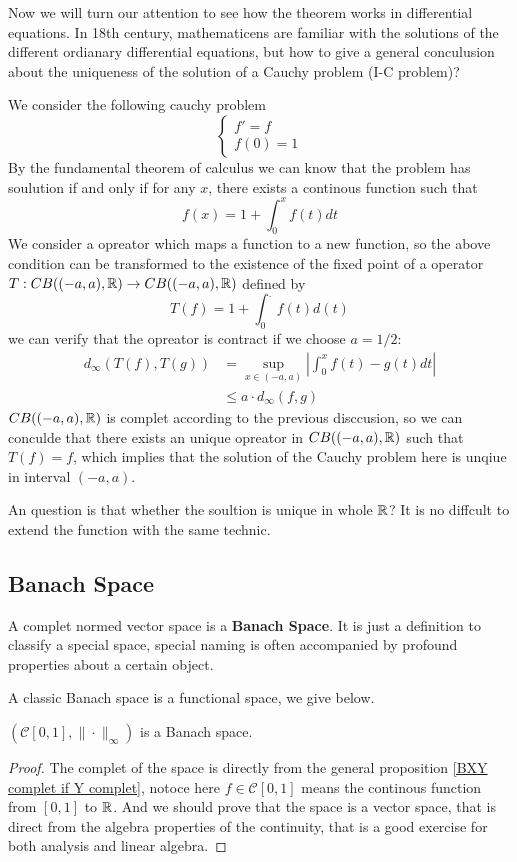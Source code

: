\documentclass[en,hazy,blue,noraml,12pt]{elegantnote}
\begin{document}
Now we will turn our attention to see how the theorem works in differential equations. In 18th century, mathematicens are familiar with the solutions of the different ordianary differential equations, but how to give a general conculusion about the uniqueness of the solution of a Cauchy problem (I-C problem)?

\begin{example}
    We consider the following cauchy problem 
    \[\begin{cases}
        f'=f \\
        f(0)=1
    \end{cases}\]
    By the fundamental theorem of calculus we can know that the problem has soulution if and only if for any \(x\), there exists a continous function such that 
    \[f(x) = 1+ \int^x_0 f(t)dt\]
    We consider a opreator which maps a function to a new function, so the above condition can be transformed to the existence of the fixed point of a operator \(T: CB((-a,a),\mathbb{R}) \to CB((-a,a),\mathbb{R})\) defined by 
    \[T(f) = 1+\int_0^{.}f(t)d(t)\]
    we can verify that the opreator is contract if we choose \(a =1/2\):
    \begin{align*}
        d_{\infty}(T(f),T(g)) &= \sup_{x \in (-a,a)}|\int_{0}^{x}f(t)-g(t)dt| \\
        &\leq a \cdot d_{\infty}(f,g)
    \end{align*}
    \(CB((-a,a),\mathbb{R})\) is complet according to the previous disccusion, so we can conculde that there exists an unique opreator in \(CB((-a,a),\mathbb{R})\) such that \(T(f)=f\), which implies that the solution of the Cauchy problem here is unqiue in interval \((-a,a)\). 

    An question is that whether the soultion is unique in whole \(\mathbb{R}\)? It is no diffcult to extend the function with the same technic. 
\end{example}

\subsection{Banach Space}

A complet normed vector space is a \textbf{Banach Space}. It is just a  definition to classify a special space, special naming is often accompanied by profound properties about a certain object. 

A classic Banach space is a functional space, we give below.

\begin{proposition}
    \((\mathcal{C} [0,1],\|\cdot\|_{\infty})\) is a Banach space.

    \begin{proof}
        The complet of the space is directly from the general proposition \ref{BXY complet if Y complet}, notoce here \(f \in \mathcal{C} [0,1]\) means the continous function from \([0,1]\) to \(\mathbb{R}\). And we should prove that the space is a vector space, that is direct from the algebra properties of the continuity, that is a good exercise for both analysis and linear algebra.
    \end{proof}
\end{proposition}
\end{document}
